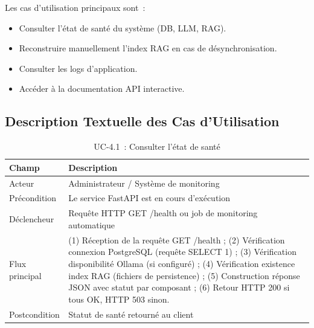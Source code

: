 Les cas d'utilisation principaux sont~:
\begin{itemize}
    \item Consulter l'état de santé du système (DB, LLM, RAG).
    \item Reconstruire manuellement l'index RAG en cas de désynchronisation.
    \item Consulter les logs d'application.
    \item Accéder à la documentation API interactive.
\end{itemize}

\subsection{Description Textuelle des Cas d'Utilisation}

\begin{table}[H]
    \centering
    \caption{UC-4.1~: Consulter l'état de santé}
    \label{tab:uc41}
    \small
    \begin{tabular}{p{3cm} p{11cm}}
        \toprule
        \textbf{Champ} & \textbf{Description} \\
        \midrule
        Acteur & Administrateur / Système de monitoring \\
        Précondition & Le service FastAPI est en cours d'exécution \\
        Déclencheur & Requête HTTP GET /health ou job de monitoring automatique \\
        Flux principal & (1) Réception de la requête GET /health ; (2) Vérification connexion 
        PostgreSQL (requête SELECT 1) ; (3) Vérification disponibilité Ollama (si configuré) ; 
        (4) Vérification existence index RAG (fichiers de persistence) ; (5) Construction réponse 
        JSON avec statut par composant ; (6) Retour HTTP 200 si tous OK, HTTP 503 sinon. \\
        Postcondition & Statut de santé retourné au client \\
        \bottomrule
    \end{tabular}
\end{table}

